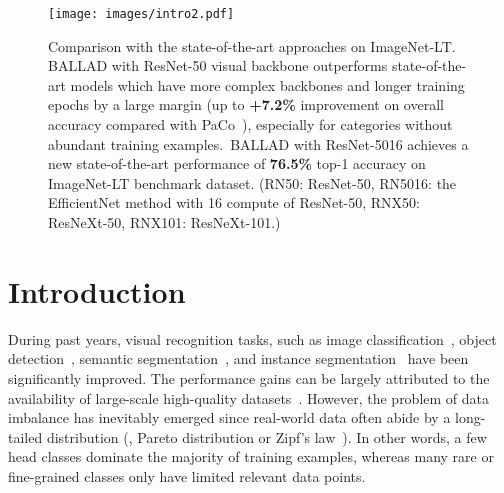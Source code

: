 \documentclass[10pt,twocolumn,letterpaper]{article}
\newcommand{\approach}{\textsc{BALLAD}}
\begin{document}
\begin{figure}[ht!]
\centering
\texttt{[image: images/intro2.pdf]}
\vspace*{-13pt}
\caption{Comparison with the state-of-the-art approaches on ImageNet-LT. \approach{} with ResNet-50 visual backbone outperforms state-of-the-art models which have more complex backbones and longer training epochs by a large margin (up to \textbf{+7.2\%} improvement on overall accuracy compared with PaCo~\cite{cui2021parametric}), especially for categories without abundant training examples.~\approach{} with ResNet-5016 achieves a new state-of-the-art performance of \textbf{76.5\%} top-1 accuracy on ImageNet-LT benchmark dataset. (RN50: ResNet-50, RN5016: the EfficientNet method with 16 compute of ResNet-50, RNX50: ResNeXt-50, RNX101: ResNeXt-101.)}
\vspace*{-13pt}
\label{fig:intro}
\end{figure}

\section{Introduction}
\label{sec:intro}
During past years, visual recognition tasks, such as image classification~\cite{simonyan15,he2016deep,xie2017aggregated}, object detection~\cite{ren2015faster,lin2017feature}, semantic segmentation~\cite{long2015fully,chen2017deeplab,zhao2017pyramid}, and instance segmentation~\cite{he2017mask,hu2018learning,liu2018path} have been significantly improved. 
The performance gains can be largely attributed to the availability of large-scale high-quality datasets~\cite{deng2009imagenet,lin2014microsoft,krishna2017visual}.
However, the problem of data imbalance has inevitably emerged since real-world data often abide by a long-tailed distribution (\eg, Pareto distribution\cite{pareto1964cours} or Zipf's law~\cite{zipf1949human}). In other words, a few head classes dominate the majority of training examples, whereas many rare or fine-grained classes only have limited relevant data points.
\end{document}
